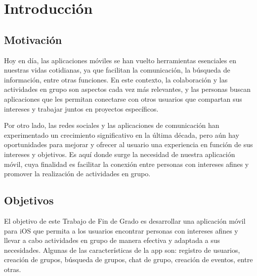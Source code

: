 \chapter{Introducción}
\section{Motivación}
Hoy en día, las aplicaciones móviles se han vuelto herramientas 
esenciales en nuestras vidas cotidianas, ya que facilitan la 
comunicación, la búsqueda de información, entre otras funciones. 
En este contexto, la colaboración y las actividades en grupo son 
aspectos cada vez más relevantes, y las personas buscan aplicaciones 
que les permitan conectarse con otros usuarios que compartan sus 
intereses y trabajar juntos en proyectos específicos.

Por otro lado, las redes sociales y las aplicaciones de comunicación 
han experimentado un crecimiento significativo en la última década, 
pero aún hay oportunidades para mejorar y ofrecer al usuario una experiencia en función de sus intereses y objetivos. Es aquí donde 
surge la necesidad de nuestra aplicación móvil, cuya finalidad es 
facilitar la conexión entre personas con intereses afines y promover 
la realización de actividades en grupo.

\section{Objetivos}
El objetivo de este Trabajo de Fin de Grado es desarrollar una 
aplicación móvil para iOS que permita a los usuarios 
encontrar personas con intereses afines y llevar a cabo actividades 
en grupo de manera efectiva y adaptada a sus necesidades. Algunas 
de las características de la app son: registro de usuarios, creación 
de grupos, búsqueda de grupos, chat de grupo, creación de eventos, entre otras.

\begin{comment}
Para satisfacer las necesidades de los usuarios, se ha diseñado una 
interfaz amigable y funcional que facilite la interacción y el uso de 
la aplicación.
\end{comment}
